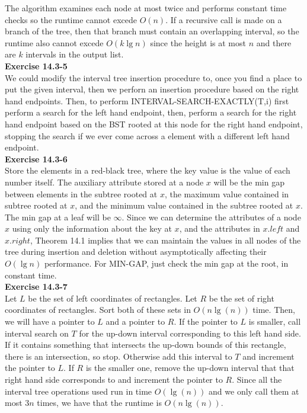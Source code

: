 \documentclass{article}
\begin{document}
The algorithm examines each node at most twice and performs constant time checks so the runtime cannot excede $O(n)$.  If a recursive call is made on a branch of the tree, then that branch must contain an overlapping interval, so the runtime also cannot excede $O(k\lg n)$ since the height is at most $n$ and there are $k$ intervals in the output list.\\

\noindent\textbf{ Exercise 14.3-5} \\

We could modify the interval tree insertion procedure to, once you find a place to put the given interval, then we perforn an insertion procedure based on the right hand endpoints. Then, to perform INTERVAL-SEARCH-EXACTLY(T,i) first perform a search for the left hand endpoint, then, perform a search for the right hand endpoint based on the BST rooted at this node for the right hand endpoint, stopping the search if we ever come across a element with a different left hand endpoint.\\

\noindent\textbf{Exercise 14.3-6}\\

Store the elements in a red-black tree, where the key value is the value of each number itself.  The auxiliary attribute stored at a node $x$ will be the min gap between elements in the subtree rooted at $x$, the maximum value contained in subtree rooted at $x$, and the minimum value contained in the subtree rooted at $x$.  The min gap at a leaf will be $\infty$.  Since we can determine the attributes of a node $x$ using only the information about the key at $x$, and the attributes in $x.left$ and $x.right$, Theorem 14.1 implies that we can maintain the values in all nodes of the tree during insertion and deletion without asymptotically affecting their $O(\lg n)$ performance.  For MIN-GAP, just check the min gap at the root, in constant time.\\


\noindent\textbf{ Exercise 14.3-7} \\

Let $L$ be the set of left coordinates of rectangles. Let $R$ be the set of right coordinates of rectangles. Sort both of these sets in $O(n\lg(n))$ time. Then, we will have a pointer to $L$ and a pointer to $R$. If the pointer to $L$ is smaller, call interval search on $T$ for the up-down interval corresponding to this left hand side. If it contains something that intersects the up-down bounds of this rectangle, there is an intersection, so stop. Otherwise add this interval to $T$ and increment the pointer to $L$. If $R$ is the smaller one, remove the up-down interval that that right hand side corresponds to and increment the pointer to $R$. Since all the interval tree operations used run in time $O(\lg(n))$ and we only call them at most $3n$ times, we have that the runtime is $O(n\lg(n))$.\\
\end{document}
